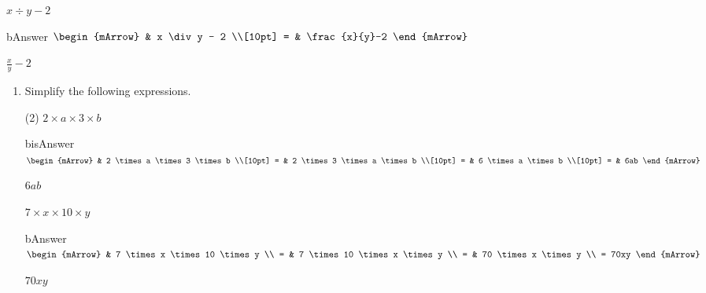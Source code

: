 \begin{enumerate}[resume]
\begin{subtask}
    \task[]  $ x \div y - 2  $
              \begin{envOut}[height=3cm]{bAnswer}
			       $\begin{mArrow}
			                &  x \div y - 2       \\[10pt]
                          = & \frac{x}{y}-2	   
	                \end{mArrow}$
              \end{envOut}			  
			  \begin{exercise}\begin{shortsolution}  
				       $\frac{x}{y}-2$
			  \end{shortsolution}\end{exercise}


  \end{subtask}

\end{enumerate}

\clearpage
\begin{enumerate}[resume]	

  \item Simplify the following expressions.
  \begin{subtask}(2)
    \task[]  $ 2 \times a \times 3 \times b$
              \begin{envOut}[height=6cm]{bisAnswer}
			       $\begin{mArrow}
			                & 2 \times a \times 3 \times b      \\[10pt]
                          = & 2 \times 3 \times a \times b      \\[10pt] 	 
                          = & 6 \times a \times b               \\[10pt] 	
                          = & 6ab               							  
	                \end{mArrow}$
              \end{envOut}			  
			  \begin{exercise}\begin{shortsolution}  
				       $6ab$
			  \end{shortsolution}\end{exercise}

    \task[]  $ 7 \times x \times 10 \times y $
              \begin{envOut}[height=6cm]{bAnswer}
			       $\begin{mArrow}
			                & 7 \times x \times 10 \times y      \\
                          = & 7 \times 10 \times x \times y	     \\
						  = & 70  \times x \times y	             \\
						  = 70xy 
	                \end{mArrow}$
              \end{envOut}			  
			  \begin{exercise}\begin{shortsolution}  
				       $70xy$
			  \end{shortsolution}\end{exercise}
    \end{subtask}
\end{enumerate}

